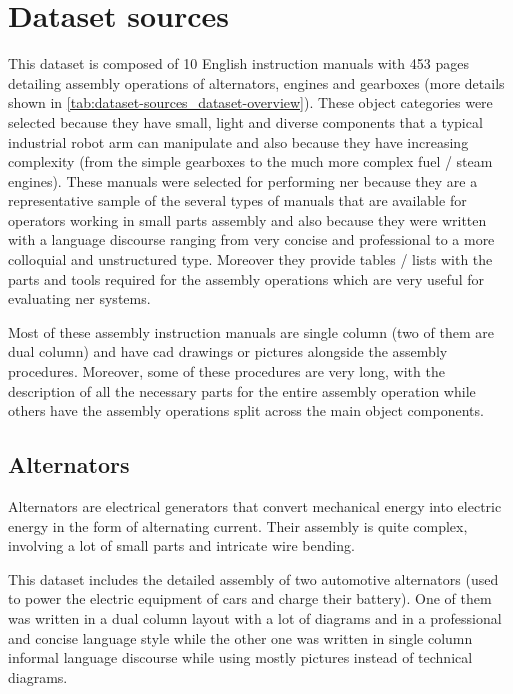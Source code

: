\section{Dataset sources}\label{sec:dataset-sources}

This dataset is composed of 10 English instruction manuals with 453 pages detailing assembly operations of alternators, engines and gearboxes (more details shown in \cref{tab:dataset-sources_dataset-overview}). These object categories were selected because they have small, light and diverse components that a typical industrial robot arm can manipulate and also because they have increasing complexity (from the simple gearboxes to the much more complex fuel / steam engines). These manuals were selected for performing \gls{ner} because they are a representative sample of the several types of manuals that are available for operators working in small parts assembly and also because they were written with a language discourse ranging from very concise and professional to a more colloquial and unstructured type. Moreover they provide tables / lists with the parts and tools required for the assembly operations which are very useful for evaluating \gls{ner} systems.

Most of these assembly instruction manuals are single column (two of them are dual column) and have \gls{cad} drawings or pictures alongside the assembly procedures. Moreover, some of these procedures are very long, with the description of all the necessary parts for the entire assembly operation while others have the assembly operations split across the main object components.


\subsection{Alternators}

Alternators are electrical generators that convert mechanical energy into electric energy in the form of alternating current. Their assembly is quite complex, involving a lot of small parts and intricate wire bending.

This dataset includes the detailed assembly of two automotive alternators (used to power the electric equipment of cars and charge their battery). One of them was written in a dual column layout with a lot of diagrams and in a professional and concise language style while the other one was written in single column informal language discourse while using mostly pictures instead of technical diagrams.


